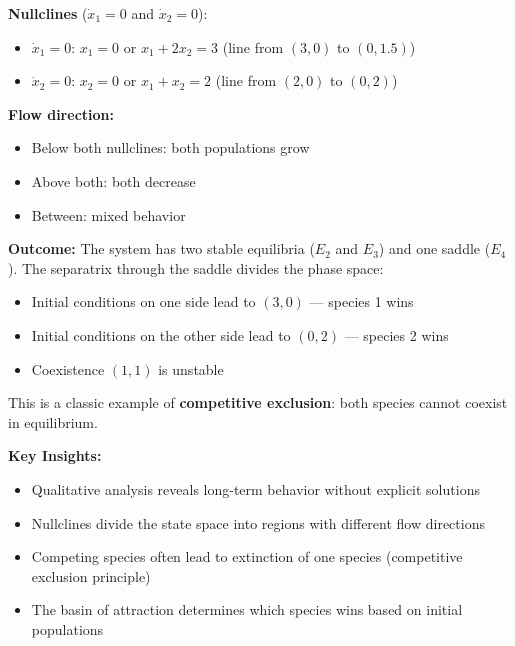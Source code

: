 \documentclass[11pt,a4paper]{article}
\begin{document}
\textbf{Nullclines} ($\dot{x}_1 = 0$ and $\dot{x}_2 = 0$):
\begin{itemize}
  \item $\dot{x}_1 = 0$: $x_1 = 0$ or $x_1 + 2x_2 = 3$ (line from $(3,0)$ to $(0, 1.5)$)
  \item $\dot{x}_2 = 0$: $x_2 = 0$ or $x_1 + x_2 = 2$ (line from $(2,0)$ to $(0, 2)$)
\end{itemize}

\textbf{Flow direction:}
\begin{itemize}
  \item Below both nullclines: both populations grow
  \item Above both: both decrease
  \item Between: mixed behavior
\end{itemize}

\textbf{Outcome:} The system has two stable equilibria ($E_2$ and $E_3$) and one saddle ($E_4$). The separatrix through the saddle divides the phase space:
\begin{itemize}
  \item Initial conditions on one side lead to $(3, 0)$ — species 1 wins
  \item Initial conditions on the other side lead to $(0, 2)$ — species 2 wins
  \item Coexistence $(1,1)$ is unstable
\end{itemize}

This is a classic example of \textbf{competitive exclusion}: both species cannot coexist in equilibrium.

\textbf{Key Insights:}
\begin{itemize}
  \item Qualitative analysis reveals long-term behavior without explicit solutions
  \item Nullclines divide the state space into regions with different flow directions
  \item Competing species often lead to extinction of one species (competitive exclusion principle)
  \item The basin of attraction determines which species wins based on initial populations
\end{itemize}
\end{document}
